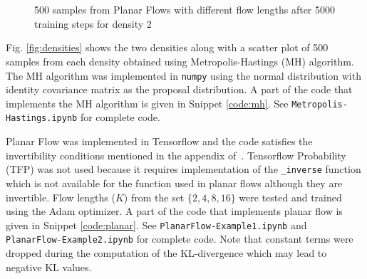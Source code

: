 \documentclass[runningheads]{llncs}
\begin{document}
\begin{figure}
	\centering
	\\
	\\
	\caption{500 samples from Planar Flows with different flow lengths after 5000 training steps for density 2}
	\label{fig:density2}
\end{figure}

Fig. \ref{fig:densities} shows the two densities along with a scatter plot of 500 samples from each density obtained using Metropolis-Hastings (MH) algorithm. The MH algorithm was implemented in \texttt{numpy} using the normal distribution with identity covariance matrix as the proposal distribution. A part of the code that implements the MH algorithm is given in Snippet \ref{code:mh}. See \texttt{Metropolis-Hastings.ipynb} for complete code.

Planar Flow was implemented in Tensorflow and the code satisfies the invertibility conditions mentioned in the appendix of~\cite{rezende2015variational}. Tensorflow Probability (TFP) was not used because it requires implementation of the \texttt{\_inverse} function which is not available for the function used in planar flows although they are invertible. Flow lengths ($K$) from the set $\{2, 4, 8, 16\}$ were tested and trained using the Adam optimizer. A part of the code that implements planar flow is given in Snippet \ref{code:planar}. See \texttt{PlanarFlow-Example1.ipynb} and \texttt{PlanarFlow-Example2.ipynb} for complete code. Note that constant terms were dropped during the computation of the KL-divergence which may lead to negative KL values.
\end{document}
